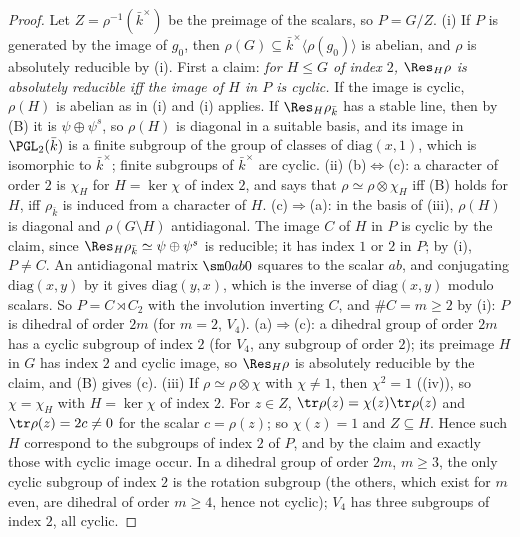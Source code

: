 \begin{proof}
Let $Z=\rho^{-1}(\bar k^\times)$ be the preimage of the scalars, so $P=G/Z$. (i) If $P$ is generated by the image of $g_0$, then $\rho(G)\subseteq\bar k^\times\langle\rho(g_0)\rangle$
is abelian, and $\rho$ is absolutely reducible by (i).
First a claim: \emph{for $H\le G$ of index $2$, $\Res_H\rho$ is absolutely reducible iff the image of $H$ in $P$ is cyclic.} If the image is cyclic,
$\rho(H)$ is abelian as in (i) and (i) applies. If $\Res_H\rho_{\bar k}$ has a stable line, then by
(B) it is $\psi\oplus\psi^s$, so $\rho(H)$ is diagonal in a suitable basis, and its image in $\PGL_2(\bar k)$ is a finite
subgroup of the group of classes of $\mathrm{diag}(x,1)$, which is isomorphic to $\bar k^\times$; finite subgroups of $\bar k^\times$ are cyclic.
(ii) (b)$\Leftrightarrow$(c): a character of order $2$ is $\chi_H$ for $H=\ker\chi$ of index $2$, and  says that
$\rho\simeq\rho\otimes\chi_H$ iff (B) holds for $H$, iff $\rho_{\bar k}$ is induced from a character of $H$. (c)$\Rightarrow$(a): in the basis of
(iii), $\rho(H)$ is diagonal and $\rho(G\setminus H)$ antidiagonal. The image $C$ of $H$ in $P$ is cyclic by the claim, since $\Res_H\rho_{\bar k}\simeq\psi\oplus\psi^s$ is reducible; it has index
$1$ or $2$ in $P$; by (i), $P\ne C$. An antidiagonal matrix $\sm0ab0$ squares to the scalar $ab$, and conjugating $\mathrm{diag}(x,y)$ by it gives
$\mathrm{diag}(y,x)$, which is the inverse of $\mathrm{diag}(x,y)$ modulo scalars. So $P=C\rtimes C_2$ with the involution inverting $C$, and $\#C=m\ge2$ by
(i): $P$ is dihedral of order $2m$ (for $m=2$, $V_4$). (a)$\Rightarrow$(c): a dihedral group of order $2m$ has a cyclic subgroup of index $2$
(for $V_4$, any subgroup of order $2$); its preimage $H$ in $G$ has index $2$ and cyclic image, so $\Res_H\rho$ is absolutely reducible by the
claim, and (B) gives (c).
(iii) If $\rho\simeq\rho\otimes\chi$ with $\chi\ne1$, then $\chi^2=1$ ((iv)), so $\chi=\chi_H$ with $H=\ker\chi$ of index $2$. For $z\in Z$,
$\tr\rho(z)=\chi(z)\tr\rho(z)$ and $\tr\rho(z)=2c\ne0$ for the scalar $c=\rho(z)$; so $\chi(z)=1$ and $Z\subseteq H$. Hence such $H$ correspond to the
subgroups of index $2$ of $P$, and by the claim and  exactly those with cyclic image occur. In a dihedral
group of order $2m$, $m\ge3$, the only cyclic subgroup of index $2$ is the rotation subgroup (the others, which exist for $m$ even, are
dihedral of order $m\ge4$, hence not cyclic); $V_4$ has three subgroups of index $2$, all cyclic.
\end{proof}

